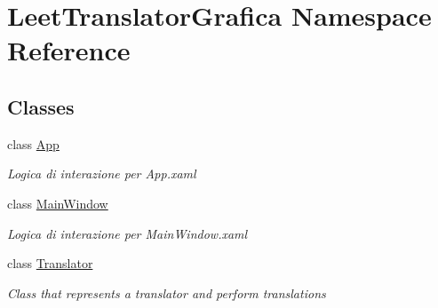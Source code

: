 \hypertarget{namespace_leet_translator_grafica}{}\section{Leet\+Translator\+Grafica Namespace Reference}
\label{namespace_leet_translator_grafica}
\subsection*{Classes}
\begin{DoxyCompactItemize}
\item 
class \mbox{\hyperlink{class_leet_translator_grafica_1_1_app}{App}}
\begin{DoxyCompactList}\small\item\em Logica di interazione per App.\+xaml \end{DoxyCompactList}\item 
class \mbox{\hyperlink{class_leet_translator_grafica_1_1_main_window}{Main\+Window}}
\begin{DoxyCompactList}\small\item\em Logica di interazione per Main\+Window.\+xaml \end{DoxyCompactList}\item 
class \mbox{\hyperlink{class_leet_translator_grafica_1_1_translator}{Translator}}
\begin{DoxyCompactList}\small\item\em Class that represents a translator and perform translations \end{DoxyCompactList}\end{DoxyCompactItemize}
